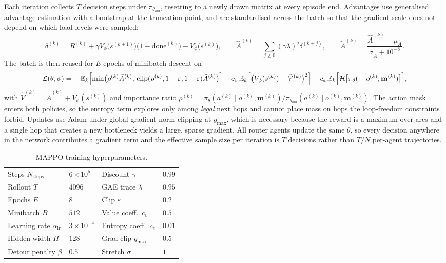 Each iteration collects $T$ decision steps under $\pi_{\theta_{\mathrm{old}}}$, resetting to a
newly drawn matrix at every episode end. Advantages use generalised advantage estimation with a
bootstrap at the truncation point, and are standardised across the batch so that the gradient
scale does not depend on which load levels were sampled:
\begin{equation}
\delta^{(k)} = R^{(k)} + \gamma V_\phi\bigl(s^{(k+1)}\bigr)\bigl(1-\mathrm{done}^{(k)}\bigr) - V_\phi\bigl(s^{(k)}\bigr),
\qquad
\hat{A}^{(k)} = \sum_{j\ge 0} (\gamma\lambda)^{j}\delta^{(k+j)},
\qquad
\tilde{A}^{(k)} = \frac{\hat{A}^{(k)} - \mu_{\hat{A}}}{\sigma_{\hat{A}} + 10^{-8}} .
\end{equation}
The batch is then reused for $E$ epochs of minibatch descent on
\begin{equation}
\mathcal{L}(\theta,\phi) =
-\,\mathbb{E}_{k}\Bigl[\min\bigl(\rho^{(k)}\tilde{A}^{(k)},\,
\mathrm{clip}(\rho^{(k)},1-\varepsilon,1+\varepsilon)\tilde{A}^{(k)}\bigr)\Bigr]
+ c_v\,\mathbb{E}_{k}\Bigl[\bigl(V_\phi(s^{(k)})-\hat{V}^{(k)}\bigr)^{2}\Bigr]
- c_e\,\mathbb{E}_{k}\Bigl[\mathcal{H}\bigl[\pi_\theta(\cdot\mid o^{(k)},\mathbf{m}^{(k)})\bigr]\Bigr],
\end{equation}
with $\hat{V}^{(k)} = \hat{A}^{(k)} + V_\phi(s^{(k)})$ and importance ratio
$\rho^{(k)} = \pi_\theta(a^{(k)}\mid o^{(k)},\mathbf{m}^{(k)}) /
\pi_{\theta_{\mathrm{old}}}(a^{(k)}\mid o^{(k)},\mathbf{m}^{(k)})$. The action mask enters both
policies, so the entropy term explores only among \emph{legal} next hops and cannot place mass on
hops the loop-freedom constraints forbid. Updates use Adam under global gradient-norm clipping at
$g_{\max}$, which is necessary because the reward is a maximum over arcs and a single hop that
creates a new bottleneck yields a large, sparse gradient. All router agents update the same
$\theta$, so every decision anywhere in the network contributes a gradient term and the effective
sample size per iteration is $T$ decisions rather than $T/N$ per-agent trajectories.

\begin{table}[h]
\centering
\begin{tabular}{llll}
\hline
Steps $N_{\mathrm{steps}}$ & $6\times10^{5}$ & Discount $\gamma$ & $0.99$ \\
Rollout $T$ & $4096$ & GAE trace $\lambda$ & $0.95$ \\
Epochs $E$ & $8$ & Clip $\varepsilon$ & $0.2$ \\
Minibatch $B$ & $512$ & Value coeff.\ $c_v$ & $0.5$ \\
Learning rate $\alpha_{\mathrm{lr}}$ & $3\times10^{-4}$ & Entropy coeff.\ $c_e$ & $0.01$ \\
Hidden width $H$ & $128$ & Grad clip $g_{\max}$ & $0.5$ \\
Detour penalty $\beta$ & $0.5$ & Stretch $\sigma$ & $1$ \\
\hline
\end{tabular}
\caption{MAPPO training hyperparameters.}
\label{tab:hyperparams}
\end{table}


